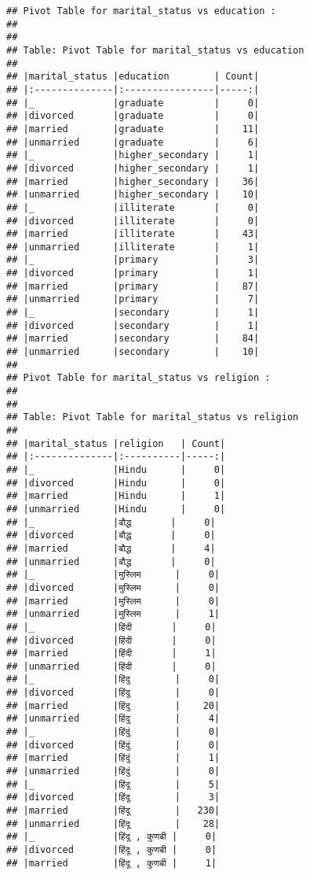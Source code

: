 \documentclass[
]{article}
\begin{document}
\begin{verbatim}
## Pivot Table for marital_status vs education :
## 
## 
## Table: Pivot Table for marital_status vs education
## 
## |marital_status |education        | Count|
## |:--------------|:----------------|-----:|
## |_              |graduate         |     0|
## |divorced       |graduate         |     0|
## |married        |graduate         |    11|
## |unmarried      |graduate         |     6|
## |_              |higher_secondary |     1|
## |divorced       |higher_secondary |     1|
## |married        |higher_secondary |    36|
## |unmarried      |higher_secondary |    10|
## |_              |illiterate       |     0|
## |divorced       |illiterate       |     0|
## |married        |illiterate       |    43|
## |unmarried      |illiterate       |     1|
## |_              |primary          |     3|
## |divorced       |primary          |     1|
## |married        |primary          |    87|
## |unmarried      |primary          |     7|
## |_              |secondary        |     1|
## |divorced       |secondary        |     1|
## |married        |secondary        |    84|
## |unmarried      |secondary        |    10|
## 
## Pivot Table for marital_status vs religion :
## 
## 
## Table: Pivot Table for marital_status vs religion
## 
## |marital_status |religion   | Count|
## |:--------------|:----------|-----:|
## |_              |Hindu      |     0|
## |divorced       |Hindu      |     0|
## |married        |Hindu      |     1|
## |unmarried      |Hindu      |     0|
## |_              |बौद्ध       |     0|
## |divorced       |बौद्ध       |     0|
## |married        |बौद्ध       |     4|
## |unmarried      |बौद्ध       |     0|
## |_              |मुस्लिम      |     0|
## |divorced       |मुस्लिम      |     0|
## |married        |मुस्लिम      |     0|
## |unmarried      |मुस्लिम      |     1|
## |_              |हिंदी       |     0|
## |divorced       |हिंदी       |     0|
## |married        |हिंदी       |     1|
## |unmarried      |हिंदी       |     0|
## |_              |हिंदु        |     0|
## |divorced       |हिंदु        |     0|
## |married        |हिंदु        |    20|
## |unmarried      |हिंदु        |     4|
## |_              |हिंदुं        |     0|
## |divorced       |हिंदुं        |     0|
## |married        |हिंदुं        |     1|
## |unmarried      |हिंदुं        |     0|
## |_              |हिंदू        |     5|
## |divorced       |हिंदू        |     3|
## |married        |हिंदू        |   230|
## |unmarried      |हिंदू        |    28|
## |_              |हिंदू , कुणबी |     0|
## |divorced       |हिंदू , कुणबी |     0|
## |married        |हिंदू , कुणबी |     1|

\end{verbatim}
\end{document}
